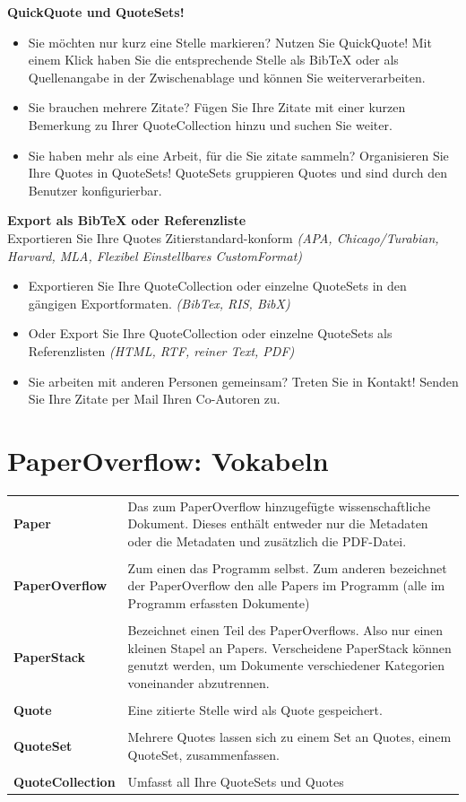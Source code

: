\documentclass[a4paper,12pt]{article}
\begin{document}
\textbf{QuickQuote und QuoteSets!}
\begin{itemize}
	\item Sie möchten nur kurz eine Stelle markieren? Nutzen Sie QuickQuote! Mit einem Klick haben Sie die entsprechende Stelle als BibTeX oder als Quellenangabe in der Zwischenablage und können Sie weiterverarbeiten.
	\item Sie brauchen mehrere Zitate? Fügen Sie Ihre Zitate mit einer kurzen Bemerkung zu Ihrer QuoteCollection hinzu und suchen Sie weiter.
	\item Sie haben mehr als eine Arbeit, für die Sie zitate sammeln? Organisieren Sie Ihre Quotes in QuoteSets! QuoteSets gruppieren Quotes und sind durch den Benutzer konfigurierbar.
\end{itemize}

\textbf{Export als BibTeX oder Referenzliste}\\
Exportieren Sie Ihre Quotes Zitierstandard-konform \textit{(APA, Chicago/Turabian, Harvard, MLA, Flexibel Einstellbares CustomFormat)}
\begin{itemize}
	\item Exportieren Sie Ihre QuoteCollection oder einzelne QuoteSets in den gängigen Exportformaten. \textit{(BibTex, RIS, BibX)}
	\item Oder Export Sie Ihre QuoteCollection oder einzelne QuoteSets als Referenzlisten \textit{(HTML, RTF, reiner Text, PDF)}
	\item Sie arbeiten mit anderen Personen gemeinsam? Treten Sie in Kontakt! Senden Sie Ihre Zitate per Mail Ihren Co-Autoren zu.
\end{itemize}



\pagebreak
\section{PaperOverflow: Vokabeln}
\begin{tabular}{ p{5cm} p{8.5cm} }
  \textbf{Paper} & Das zum PaperOverflow hinzugefügte wissenschaftliche Dokument. Dieses enthält entweder nur die Metadaten oder die Metadaten und zusätzlich die PDF-Datei. \\ \\
  \textbf{PaperOverflow} & Zum einen das Programm selbst. Zum anderen bezeichnet der PaperOverflow den alle Papers im Programm (alle im Programm erfassten Dokumente) \\ \\
  \textbf{PaperStack} & Bezeichnet einen Teil des PaperOverflows. Also nur einen kleinen Stapel an Papers. Verscheidene PaperStack können genutzt werden, um Dokumente verschiedener Kategorien voneinander abzutrennen.\\ \\
  \textbf{Quote} & Eine zitierte Stelle wird als Quote gespeichert.\\ \\
  \textbf{QuoteSet} & Mehrere Quotes lassen sich zu einem Set an Quotes, einem QuoteSet, zusammenfassen.\\ \\
  \textbf{QuoteCollection} & Umfasst all Ihre QuoteSets und Quotes
\end{tabular}
\end{document}
